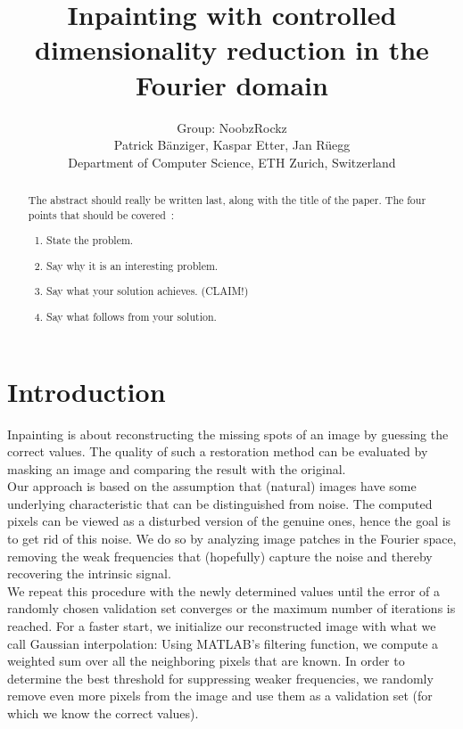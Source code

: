 \documentclass[10pt,conference,compsocconf]{IEEEtran}
\begin{document}
\title{Inpainting with controlled dimensionality reduction in the Fourier domain}

\author{
  Group: NoobzRockz\\
  Patrick Bänziger, Kaspar Etter, Jan Rüegg\\
  Department of Computer Science, ETH Zurich, Switzerland
}

\maketitle

\begin{abstract}
The abstract should really be written last, along with the title of
the paper. The four points that should be covered~\cite{jones08}:
\begin{enumerate}
\item State the problem.
\item Say why it is an interesting problem.
\item Say what your solution achieves. (CLAIM!)
\item Say what follows from your solution.
\end{enumerate}
\end{abstract}

\section{Introduction}
Inpainting is about reconstructing the missing spots of an image by guessing the correct values. The quality of such a restoration method can be evaluated by masking an image and comparing the result with the original.\\
Our approach is based on the assumption that (natural) images have some underlying characteristic that can be distinguished from noise. The computed pixels can be viewed as a disturbed version of the genuine ones, hence the goal is to get rid of this noise. We do so by analyzing image patches in the Fourier space, removing the weak frequencies that (hopefully) capture the noise and thereby recovering the intrinsic signal.\\
We repeat this procedure with the newly determined values until the error of a randomly chosen validation set converges or the maximum number of iterations is reached. For a faster start, we initialize our reconstructed image with what we call Gaussian interpolation: Using MATLAB's filtering function, we compute a weighted sum over all the neighboring pixels that are known. In order to determine the best threshold for suppressing weaker frequencies, we randomly remove even more pixels from the image and use them as a validation set (for which we know the correct values).
\end{document}
